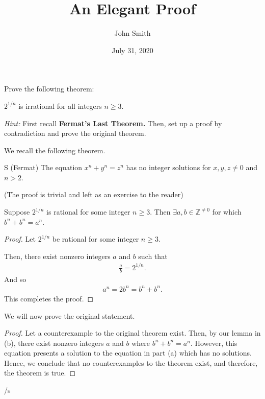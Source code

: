 \documentclass{\classpath}
\begin{document}
\title{An Elegant Proof}
\author{John Smith}
\date{July 31, 2020}

\maketitle

 Prove the following theorem:
\begin{theorem} 
    \(2^{1/n}\) is irrational for all integers \(n \geq 3\).
\end{theorem}

\textit{Hint:} 
First recall \textbf{Fermat's Last Theorem.} 
Then, set up a proof by contradiction and prove the original theorem.

\alphnum 
    We recall the following theorem.

    \begin{theorem}\label{fermat}S
        (Fermat) The equation \(x^n + y^n = z^n\) has no integer solutions for \(x,y,z \neq 0\) and \(n > 2\).
    \end{theorem}
        
    (The proof is trivial and left as an exercise to the reader)

\alphnum
    \begin{lemma}\label{lem}
        Suppose \(2^{1/n}\) is rational for some integer \(n \geq 3\). 
        Then \(\exists a, b \in \mathbb{Z}^{\neq 0}\) for which \(b^n + b^n = a^n\).
    \end{lemma}
    \begin{proof}
        Let \(2^{1/n}\) be rational for some integer \(n \geq 3\).

        Then, there exist nonzero integers \(a\) and \(b\) such that 
        \begin{align*}
            \frac{a}{b} = 2^{1/n}.
        \end{align*}
        And so
        \begin{align*}
            a^n = 2b^n = b^n + b^n.
        \end{align*}
        This completes the proof.
    \end{proof}

\alphnum
    We will now prove the original statement.

    \begin{proof}
        Let a counterexample to the original theorem exist. Then, by our lemma in (b), 
        there exist nonzero integers \(a\) and \(b\) where \(b^n + b^n = a^n\).
        However, this equation presents a solution to the equation in part (a) which has no solutions.
        Hence, we conclude that no counterexamples to the theorem exist, and therefore, the theorem is true. 
    \end{proof}

{\tiny /s}
\end{document}
